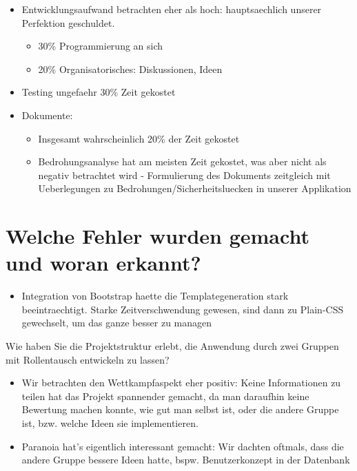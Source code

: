 \documentclass[12pt,DIV14,BCOR10mm,a4paper,parskip=half-,headsepline,headinclude,english,ngerman,bibliography=totocnumbered]{scrreprt}
\begin{document}
\begin{itemize}
  \item Entwicklungsaufwand betrachten eher als hoch: hauptsaechlich unserer Perfektion geschuldet.
  \begin{itemize}
    \item 30\% Programmierung an sich
    \item 20\% Organisatorisches: Diskussionen, Ideen
  \end{itemize}
  \item Testing ungefaehr 30\% Zeit gekostet
  \item Dokumente:
  \begin{itemize}
    \item Insgesamt wahrscheinlich 20\% der Zeit gekostet
    \item Bedrohungsanalyse hat am meisten Zeit gekostet, was aber nicht als negativ betrachtet wird - Formulierung des Dokuments zeitgleich mit Ueberlegungen zu Bedrohungen/Sicherheitsluecken in unserer Applikation
  \end{itemize}
\end{itemize}

\section{Welche Fehler wurden gemacht und woran erkannt?}

\begin{itemize}
  \item Integration von Bootstrap haette die Templategeneration stark beeintraechtigt. Starke Zeitverschwendung gewesen, sind dann zu Plain-CSS gewechselt, um das ganze besser zu managen
\end{itemize}

Wie haben Sie die Projektstruktur erlebt, die Anwendung durch zwei Gruppen mit Rollentausch entwickeln zu lassen?

\begin{itemize}
  \item Wir betrachten den Wettkampfaspekt eher positiv: Keine Informationen zu teilen hat das Projekt spannender gemacht, da man daraufhin keine Bewertung machen konnte, wie gut man selbst ist, oder die andere Gruppe ist, bzw. welche Ideen sie implementieren.
  \item Paranoia hat's eigentlich interessant gemacht: Wir dachten oftmals, dass die andere Gruppe bessere Ideen hatte, bspw. Benutzerkonzept in der Datenbank
\end{itemize}
\end{document}
